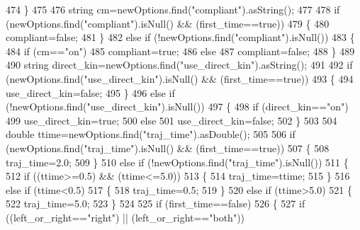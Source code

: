 \begin{DoxyCode}
474     \}
475 
476     \textcolor{keywordtype}{string} cm=newOptions.find(\textcolor{stringliteral}{"compliant"}).asString();
477 
478     \textcolor{keywordflow}{if} (newOptions.find(\textcolor{stringliteral}{"compliant"}).isNull() && (first\_time==\textcolor{keyword}{true}))
479     \{
480         compliant=\textcolor{keyword}{false};
481     \}
482     \textcolor{keywordflow}{else} \textcolor{keywordflow}{if} (!newOptions.find(\textcolor{stringliteral}{"compliant"}).isNull())
483     \{
484         \textcolor{keywordflow}{if} (cm==\textcolor{stringliteral}{"on"})
485             compliant=\textcolor{keyword}{true};
486         \textcolor{keywordflow}{else}
487             compliant=\textcolor{keyword}{false};
488     \}
489 
490     \textcolor{keywordtype}{string} direct\_kin=newOptions.find(\textcolor{stringliteral}{"use\_direct\_kin"}).asString();
491 
492     \textcolor{keywordflow}{if} (newOptions.find(\textcolor{stringliteral}{"use\_direct\_kin"}).isNull() && (first\_time==\textcolor{keyword}{true}))
493     \{
494         use\_direct\_kin=\textcolor{keyword}{false};
495     \}
496     \textcolor{keywordflow}{else} \textcolor{keywordflow}{if} (!newOptions.find(\textcolor{stringliteral}{"use\_direct\_kin"}).isNull())
497     \{
498         \textcolor{keywordflow}{if} (direct\_kin==\textcolor{stringliteral}{"on"})
499             use\_direct\_kin=\textcolor{keyword}{true};
500         \textcolor{keywordflow}{else}
501             use\_direct\_kin=\textcolor{keyword}{false};
502     \}
503 
504     \textcolor{keywordtype}{double} ttime=newOptions.find(\textcolor{stringliteral}{"traj\_time"}).asDouble();
505 
506     \textcolor{keywordflow}{if} (newOptions.find(\textcolor{stringliteral}{"traj\_time"}).isNull() && (first\_time==\textcolor{keyword}{true}))
507     \{
508         traj\_time=2.0;
509     \}
510     \textcolor{keywordflow}{else} \textcolor{keywordflow}{if} (!newOptions.find(\textcolor{stringliteral}{"traj\_time"}).isNull())
511     \{
512         \textcolor{keywordflow}{if} ((ttime>=0.5) && (ttime<=5.0))
513         \{
514             traj\_time=ttime;
515         \}
516         \textcolor{keywordflow}{else} \textcolor{keywordflow}{if} (ttime<0.5)
517         \{
518             traj\_time=0.5;
519         \}
520         \textcolor{keywordflow}{else} \textcolor{keywordflow}{if} (ttime>5.0)
521         \{
522             traj\_time=5.0;
523         \}
524 
525         \textcolor{keywordflow}{if} (first\_time==\textcolor{keyword}{false})
526         \{
527             \textcolor{keywordflow}{if} ((left\_or\_right==\textcolor{stringliteral}{"right"}) || (left\_or\_right==\textcolor{stringliteral}{"both"}))

\end{DoxyCode}
